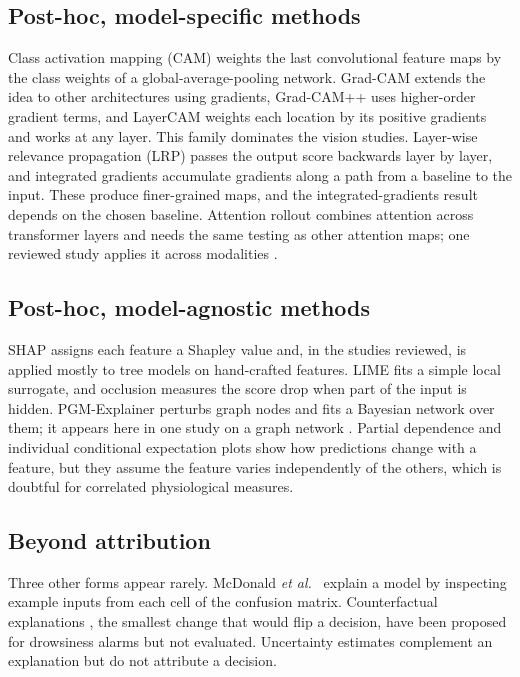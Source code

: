 \subsection{Post-hoc, model-specific methods}
Class activation mapping (CAM) \cite{zhou2016cam} weights the last convolutional feature maps by the class weights of a global-average-pooling network. Grad-CAM \cite{selvaraju2017gradcam} extends the idea to other architectures using gradients, Grad-CAM++ \cite{chattopadhay2018gradcampp} uses higher-order gradient terms, and LayerCAM \cite{jiang2021layercam} weights each location by its positive gradients and works at any layer. This family dominates the vision studies. Layer-wise relevance propagation (LRP) \cite{bach2015lrp} passes the output score backwards layer by layer, and integrated gradients \cite{sundararajan2017axiomatic} accumulate gradients along a path from a baseline to the input. These produce finer-grained maps, and the integrated-gradients result depends on the chosen baseline. Attention rollout \cite{abnar2020quantifying} combines attention across transformer layers and needs the same testing as other attention maps; one reviewed study applies it across modalities \cite{theivadas2025dynamic}.

\subsection{Post-hoc, model-agnostic methods}
SHAP \cite{lundberg2017shap} assigns each feature a Shapley value and, in the studies reviewed, is applied mostly to tree models on hand-crafted features. LIME \cite{ribeiro2016lime} fits a simple local surrogate, and occlusion \cite{zeiler2014visualizing} measures the score drop when part of the input is hidden. PGM-Explainer perturbs graph nodes and fits a Bayesian network over them; it appears here in one study on a graph network \cite{zeynalpour2025multimethod}. Partial dependence \cite{friedman2001greedy} and individual conditional expectation plots \cite{goldstein2015ice} show how predictions change with a feature, but they assume the feature varies independently of the others, which is doubtful for correlated physiological measures.

\subsection{Beyond attribution}
Three other forms appear rarely. McDonald \textit{et al.}~\cite{mcdonald2014steering} explain a model by inspecting example inputs from each cell of the confusion matrix. Counterfactual explanations \cite{wachter2017counterfactual}, the smallest change that would flip a decision, have been proposed for drowsiness alarms \cite{jha2025realtime} but not evaluated. Uncertainty estimates \cite{oise2026enhancing} complement an explanation but do not attribute a decision.


